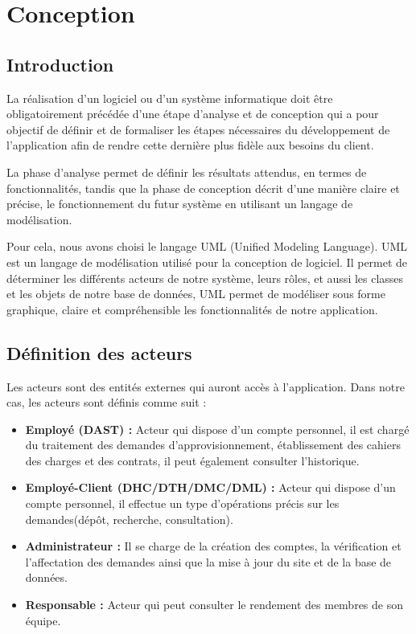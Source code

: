 \documentclass{report}
\begin{document}
\chapter{Conception}
\newpage
\section{Introduction}
La réalisation d’un logiciel ou d’un système informatique doit être  obligatoirement précédée d’une étape d’analyse et de conception qui a pour objectif de définir et de formaliser les étapes nécessaires du développement de l’application afin de rendre cette dernière plus fidèle aux besoins du client.

La phase d’analyse permet de définir les résultats attendus, en termes de fonctionnalités, tandis que la phase de conception décrit d’une manière claire et précise, le fonctionnement du futur système  en utilisant un langage de modélisation. 

Pour cela, nous avons choisi le langage UML (Unified Modeling Language).
UML  est un langage de modélisation utilisé pour la conception de logiciel. 
Il permet de déterminer les différents acteurs de notre système, leurs rôles, et aussi les classes et les objets de notre base de données, UML permet de modéliser sous forme graphique, claire et compréhensible les fonctionnalités de notre application.
\section{Définition des acteurs}
Les acteurs sont des entités externes qui auront accès à l’application. Dans notre cas, les acteurs sont définis comme suit :

\begin{itemize}
    \item \textbf{Employé (DAST) :} Acteur qui dispose d’un compte personnel, il est chargé du traitement des demandes d’approvisionnement, établissement des cahiers des charges et des contrats, il peut également consulter l’historique.
    \\
    \item \textbf{Employé-Client (DHC/DTH/DMC/DML) :} Acteur qui dispose d’un compte personnel, il effectue un type d’opérations précis  sur les demandes(dépôt, recherche, consultation).
    \\
    \item \textbf{Administrateur :} Il se charge de la création des comptes, la vérification et l’affectation des demandes ainsi que la mise à jour du site et de la base de données.
    \\
    \item \textbf{Responsable :} Acteur qui peut consulter le rendement des membres de son équipe.\\\\\\\\
\end{itemize}
\end{document}

